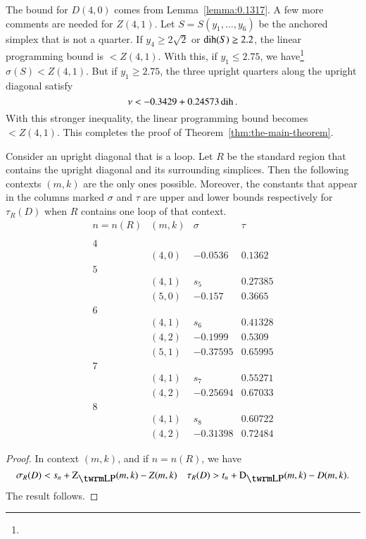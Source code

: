 The bound for $D(4,0)$ comes from Lemma~\ref{lemma:0.1317}. A few
more comments are needed for $Z(4,1)$.  Let $S=S(y_1,\ldots,y_6)$
be the anchored simplex that is not a quarter.  If $y_4\ge2\sqrt2$
or $\operatorname{dih}(S)\ge 2.2$, the linear programming bound is $<Z(4,1)$.
With this, if $y_1\le 2.75$, we have\footnote{} %
    $\sigma(S) < Z(4,1)$.
But if $y_1\ge2.75$, the three upright quarters along the upright
diagonal satisfy
    $$\nu< -0.3429+0.24573\operatorname{dih}.$$
With this stronger inequality, the linear programming bound becomes
$<Z(4,1)$. This completes the proof of
Theorem~\ref{thm:the-main-theorem}.

\begin{lemma}\label{lemma:loop}
Consider an upright diagonal that is a loop.  Let $R$ be the
standard region that contains the upright diagonal and its
surrounding simplices.   Then the following contexts $(m,k)$ are the
only ones possible.  Moreover, the constants that appear in the
columns marked $\sigma$ and $\tau$ are upper and lower bounds
respectively for $\tau_R(D)$ when $R$ contains one loop of that
context.
    $$
    \begin{array}{llll}
        n=n(R)&(m,k) &\sigma &\tau \\
        &&&\\
        4& & &\\
        &(4,0) &-0.0536 & 0.1362 \\
        5 & & &\\
        &(4,1) &s_5 &0.27385\\
        &(5,0) &-0.157   &0.3665\\
        6 & & &\\
        &(4,1) &s_6 &0.41328\\
        &(4,2) &-0.1999  &0.5309\\
        &(5,1) &-0.37595 &0.65995\\
        7 & & &\\
        &(4,1) &s_7 &0.55271\\
        &(4,2) &-0.25694 &0.67033\\
        8 & & &\\
        &(4,1) &s_8 &0.60722\\
        &(4,2) &-0.31398 &0.72484
    \end{array}
    $$
\end{lemma}

\begin{proof} In context $(m,k)$, and if $n=n(R)$, we have
    $$
    \sigma_R(D) < s_{n} + \ZLP(m,k)-Z(m,k)\quad
    \tau_R(D)> t_{n}+\DLP(m,k)-D(m,k).
    $$
The result follows.
\end{proof}


